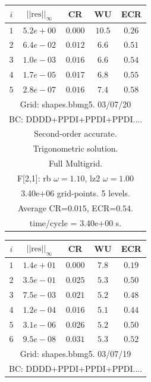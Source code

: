 \begin{table}[hbt]
\begin{center}
{\tablefontsize
\begin{tabular}{|c|c|c|c|c|} \hline 
 $i$   & $\vert\vert\mbox{res}\vert\vert_\infty$  &  CR     &  WU    & ECR  \\   \hline 
 $ 1$  & $ 5.2e+00$ & $0.000$ & $10.5$ & $0.26$ \\ 
 $ 2$  & $ 6.4e-02$ & $0.012$ & $ 6.6$ & $0.51$ \\ 
 $ 3$  & $ 1.0e-03$ & $0.016$ & $ 6.6$ & $0.54$ \\ 
 $ 4$  & $ 1.7e-05$ & $0.017$ & $ 6.8$ & $0.55$ \\ 
 $ 5$  & $ 2.8e-07$ & $0.016$ & $ 7.4$ & $0.58$ \\ 
\hline 
\multicolumn{5}{|c|}{Grid: shapes.bbmg5. 03/07/20}  \\
\multicolumn{5}{|c|}{BC: DDDD+PPDI+PPDI+PPDI....}  \\
\multicolumn{5}{|c|}{Second-order accurate.}  \\
\multicolumn{5}{|c|}{Trigonometric solution.}  \\
\multicolumn{5}{|c|}{Full Multigrid.}  \\
\multicolumn{5}{|c|}{F[2,1]: rb $\omega=1.10$, lz2 $\omega=1.00$}  \\
\multicolumn{5}{|c|}{3.40e+06 grid-points. 5 levels.}  \\
\multicolumn{5}{|c|}{Average CR=$0.015$, ECR=$0.54$.}  \\
\multicolumn{5}{|c|}{time/cycle = 3.40e+00 s.}  \\
\hline 
\end{tabular}
\begin{tabular}{|c|c|c|c|c|} \hline 
 $i$   & $\vert\vert\mbox{res}\vert\vert_\infty$  &  CR     &  WU    & ECR  \\   \hline 
 $ 1$  & $ 1.4e+01$ & $0.000$ & $ 7.8$ & $0.19$ \\ 
 $ 2$  & $ 3.5e-01$ & $0.025$ & $ 5.3$ & $0.50$ \\ 
 $ 3$  & $ 7.5e-03$ & $0.021$ & $ 5.2$ & $0.48$ \\ 
 $ 4$  & $ 1.2e-04$ & $0.016$ & $ 5.1$ & $0.44$ \\ 
 $ 5$  & $ 3.1e-06$ & $0.026$ & $ 5.2$ & $0.50$ \\ 
 $ 6$  & $ 9.5e-08$ & $0.031$ & $ 5.3$ & $0.52$ \\ 
\hline 
\multicolumn{5}{|c|}{Grid: shapes.bbmg5. 03/07/19}  \\
\multicolumn{5}{|c|}{BC: DDDD+PPDI+PPDI+PPDI....}  \\

\end{tabular}}
\end{center}
\end{table}
